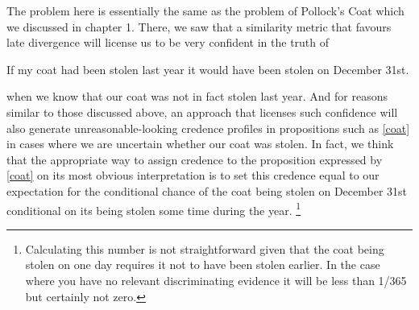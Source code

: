 \documentclass[If.tex]{subfiles}
\begin{document}
The problem here is essentially the same as the problem of Pollock's Coat which we discussed in chapter 1. There, we saw that a similarity metric that favours late divergence will license us to be very confident in the truth of
\begin{prop}
\nitem \label{coat}
  If my coat had been stolen last year it would have been stolen on
  December 31st.
\end{prop}
when we know that our coat was not in fact stolen last year. And for reasons similar to those discussed above, an approach that licenses such confidence will also generate unreasonable-looking credence profiles in propositions such as \ref{coat} in cases where we are uncertain whether our coat was stolen. In fact, we think that the appropriate way to assign credence to the proposition expressed by \ref{coat} on its most obvious interpretation is to set this credence equal to our expectation for the conditional chance of the coat being stolen on December 31st conditional on its being stolen some time during the year.%
\footnote{Calculating this number is not straightforward given that the coat being stolen on one day requires it not to have been stolen earlier. In the case where you have no relevant discriminating evidence it will be less than 1/365 but certainly not zero.}
\end{document}
